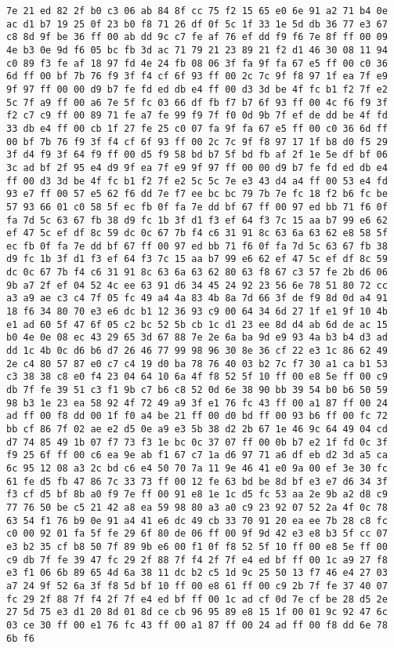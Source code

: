 \documentclass{article}
\begin{document}
\begin{verbatim}
7e 21 ed 82 2f b0 c3 06 ab 84 8f cc 75 f2 15 65 e0 6e 91 a2 71 b4 0e ac d1 b7 19 25 0f 23 b0 f8 71 26 df 0f 5c 1f 33 1e 5d db 36 77 e3 67 c8 8d 9f be 36 ff 00 ab dd 9c c7 fe af 76 ef dd f9 f6 7e 8f ff 00 09 4e b3 0e 9d f6 05 bc fb 3d ac 71 79 21 23 89 21 f2 d1 46 30 08 11 94 c0 89 f3 fe af 18 97 fd 4e 24 fb 08 06 3f fa 9f fa 67 e5 ff 00 c0 36 6d ff 00 bf 7b 76 f9 3f f4 cf 6f 93 ff 00 2c 7c 9f f8 97 1f ea 7f e9 9f 97 ff 00 00 d9 b7 fe fd ed db e4 ff 00 d3 3d be 4f fc b1 f2 7f e2 5c 7f a9 ff 00 a6 7e 5f fc 03 66 df fb f7 b7 6f 93 ff 00 4c f6 f9 3f f2 c7 c9 ff 00 89 71 fe a7 fe 99 f9 7f f0 0d 9b 7f ef de dd be 4f fd 33 db e4 ff 00 cb 1f 27 fe 25 c0 07 fa 9f fa 67 e5 ff 00 c0 36 6d ff 00 bf 7b 76 f9 3f f4 cf 6f 93 ff 00 2c 7c 9f f8 97 17 1f b8 d0 f5 29 3f d4 f9 3f 64 f9 ff 00 d5 f9 58 bd b7 5f bd fb af 2f 1e 5e df bf 06 3c ad bf 2f 95 e4 d9 9f ea 7f e9 9f 97 ff 00 00 d9 b7 fe fd ed db e4 ff 00 d3 3d be 4f fc b1 f2 7f e2 5c 5c 7e e3 43 d4 a4 ff 00 53 e4 fd 93 e7 ff 00 57 e5 62 f6 dd 7e f7 ee bc bc 79 7b 7e fc 18 f2 b6 fc be 57 93 66 01 c0 58 5f ec fb 0f fa 7e dd bf 67 ff 00 97 ed bb 71 f6 0f fa 7d 5c 63 67 fb 38 d9 fc 1b 3f d1 f3 ef 64 f3 7c 15 aa b7 99 e6 62 ef 47 5c ef df 8c 59 dc 0c 67 7b f4 c6 31 91 8c 63 6a 63 62 e8 58 5f ec fb 0f fa 7e dd bf 67 ff 00 97 ed bb 71 f6 0f fa 7d 5c 63 67 fb 38 d9 fc 1b 3f d1 f3 ef 64 f3 7c 15 aa b7 99 e6 62 ef 47 5c ef df 8c 59 dc 0c 67 7b f4 c6 31 91 8c 63 6a 63 62 80 63 f8 67 c3 57 fe 2b d6 06 9b a7 2f ef 04 52 4c ee 63 91 d6 34 45 24 92 23 56 6e 78 51 80 72 cc a3 a9 ae c3 c4 7f 05 fc 49 a4 4a 83 4b 8a 7d 66 3f de f9 8d 0d a4 91 18 f6 34 80 70 e3 e6 dc b1 12 36 93 c9 00 64 34 6d 27 1f e1 9f 10 4b e1 ad 60 5f 47 6f 05 c2 bc 52 5b cb 1c d1 23 ee 8d d4 ab 6d de ac 15 b0 4e 0e 08 ec 43 29 65 3d 67 88 7e 2e 6a ba 9d e9 93 4a b3 b4 d3 ad dd 1c 4b 0c d6 b6 d7 26 46 77 99 98 96 30 8e 36 cf 22 e3 1c 86 62 49 2e c4 80 57 87 e0 c7 c4 19 d0 ba 78 76 40 03 b2 7c f7 30 a1 ca b1 53 c3 38 38 c8 e0 f4 23 04 64 10 6a 4f f8 52 5f 10 ff 00 e8 5e ff 00 c9 db 7f fe 39 51 c3 f1 9b c7 b6 c8 52 0d 6e 38 90 bb 39 54 b0 b6 50 59 98 b3 1e 23 ea 58 92 4f 72 49 a9 3f e1 76 fc 43 ff 00 a1 87 ff 00 24 ad ff 00 f8 dd 00 1f f0 a4 be 21 ff 00 d0 bd ff 00 93 b6 ff 00 fc 72 bb cf 86 7f 02 ae e2 d5 0e a9 e3 5b 38 d2 2b 67 1e 46 9c 64 49 04 cd d7 74 85 49 1b 07 f7 73 f3 1e bc 0c 37 07 ff 00 0b b7 e2 1f fd 0c 3f f9 25 6f ff 00 c6 ea 9e ab f1 67 c7 1a d6 97 71 a6 df eb d2 3d a5 ca 6c 95 12 08 a3 2c bd c6 e4 50 70 7a 11 9e 46 41 e0 9a 00 ef 3e 30 fc 61 fe d5 fb 47 86 7c 33 73 ff 00 12 fe 63 bd be 8d bf e3 e7 d6 34 3f f3 cf d5 bf 8b a0 f9 7e ff 00 91 e8 1e 1c d5 fc 53 aa 2e 9b a2 d8 c9 77 76 50 be c5 21 42 a8 ea 59 98 80 a3 a0 c9 23 92 07 52 2a 4f 0c 78 63 54 f1 76 b9 0e 91 a4 41 e6 dc 49 cb 33 70 91 20 ea ee 7b 28 c8 fc c0 00 92 01 fa 5f fe 29 6f 80 de 06 ff 00 9f 9d 42 e3 e8 b3 5f cc 07 e3 b2 35 cf b8 50 7f 89 9b e6 00 f1 0f f8 52 5f 10 ff 00 e8 5e ff 00 c9 db 7f fe 39 47 fc 29 2f 88 7f f4 2f 7f e4 ed bf ff 00 1c a9 27 f8 e3 f1 06 6b 89 65 4d 6a 38 11 dc b2 c5 1d 9c 25 50 13 f7 46 e4 27 03 a7 24 9f 52 6a 3f f8 5d bf 10 ff 00 e8 61 ff 00 c9 2b 7f fe 37 40 07 fc 29 2f 88 7f f4 2f 7f e4 ed bf ff 00 1c ad cf 0d 7e cf be 28 d5 2e 27 5d 75 e3 d1 20 8d 01 8d ce cb 96 95 89 e8 15 1f 00 01 9c 92 47 6c 03 ce 30 ff 00 e1 76 fc 43 ff 00 a1 87 ff 00 24 ad ff 00 f8 dd 6e 78 6b f6 
\end{verbatim}
\end{document}
